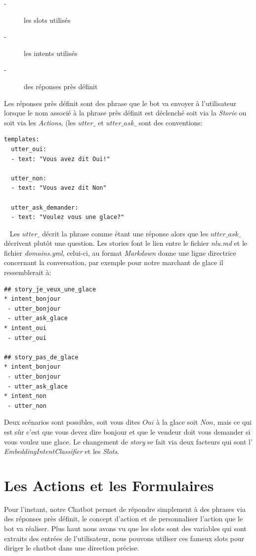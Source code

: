 \begin{description}
\item[-] les slots utilisés
\item[-] les intents utilisés
\item[-] des réponses près définit 
\end{description}

Les réponses près définit sont des phrase que le bot va envoyer à l'utilisateur lorsque le nom associé à la phrase près définit est déclenché soit via la \textit{Storie} ou soit via les \textit{Actions}, (les \textit{$utter\_$} et \textit{$utter\_ask\_$} sont des conventions:

\begin{lstlisting}
templates:
  utter_oui:
  - text: "Vous avez dit Oui!"

  utter_non:
  - text: "Vous avez dit Non"
  
  utter_ask_demander:
  - text: "Voulez vous une glace?"
\end{lstlisting}
\ \linebreak
Les \textit{$utter\_$} décrit la phrase comme étant une réponse alors que les \textit{$utter\_ask\_$} décrivent plutôt une question.
Les stories font le lien entre le fichier \textit{nlu.md} et le fichier \textit{domains.yml}, celui-ci, au format \textit{Markdown} donne une ligne directrice concernant la conversation, par exemple pour notre marchant de glace il ressemblerait à:

\begin{lstlisting}
## story_je_veux_une_glace
* intent_bonjour
 - utter_bonjour
 - utter_ask_glace
* intent_oui
 - utter_oui
 
## story_pas_de_glace
* intent_bonjour
 - utter_bonjour
 - utter_ask_glace
* intent_non
 - utter_non
\end{lstlisting}

Deux scénarios sont possibles, soit vous dites $Oui$ à la glace soit $Non$, mais ce qui est sûr c'est que vous devez dire bonjour et que le vendeur doit vous demander si vous voulez une glace.
Le changement de \textit{story} se fait via deux facteurs qui sont l' \textit{EmbeddingIntentClassifier} et les \textit{Slots}.

\section{Les Actions et les Formulaires}
Pour l'instant, notre Chatbot permet de répondre simplement à des phrases via des réponses près définit, le concept d'action et de personnaliser l'action que le bot va réaliser. Plus haut nous avons vu que les slots sont des variables qui sont extraits des entrées de l'utilisateur, nous pouvons utiliser ces fameux slots pour diriger le chatbot dans une direction précise.

